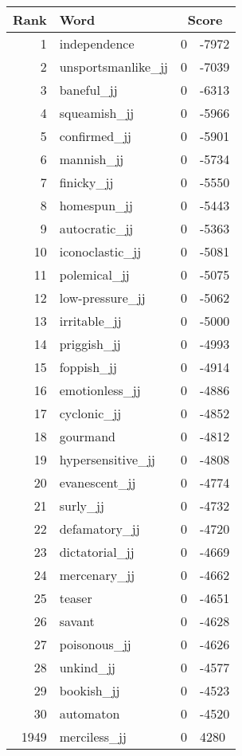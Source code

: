 \begin{longtable}[!htbp]{| rlr@{.}l |}
    \hline
    \textbf{Rank} & \textbf{Word} & \multicolumn{2}{c|}{\textbf{Score}} \\
    \hline
    \endhead
    1 & independence & 0 & -7972 \\
    2 & unsportsmanlike\_jj & 0 & -7039 \\
    3 & baneful\_jj & 0 & -6313 \\
    4 & squeamish\_jj & 0 & -5966 \\
    5 & confirmed\_jj & 0 & -5901 \\
    6 & mannish\_jj & 0 & -5734 \\
    7 & finicky\_jj & 0 & -5550 \\
    8 & homespun\_jj & 0 & -5443 \\
    9 & autocratic\_jj & 0 & -5363 \\
    10 & iconoclastic\_jj & 0 & -5081 \\
    11 & polemical\_jj & 0 & -5075 \\
    12 & low-pressure\_jj & 0 & -5062 \\
    13 & irritable\_jj & 0 & -5000 \\
    14 & priggish\_jj & 0 & -4993 \\
    15 & foppish\_jj & 0 & -4914 \\
    16 & emotionless\_jj & 0 & -4886 \\
    17 & cyclonic\_jj & 0 & -4852 \\
    18 & gourmand & 0 & -4812 \\
    19 & hypersensitive\_jj & 0 & -4808 \\
    20 & evanescent\_jj & 0 & -4774 \\
    21 & surly\_jj & 0 & -4732 \\
    22 & defamatory\_jj & 0 & -4720 \\
    23 & dictatorial\_jj & 0 & -4669 \\
    24 & mercenary\_jj & 0 & -4662 \\
    25 & teaser & 0 & -4651 \\
    26 & savant & 0 & -4628 \\
    27 & poisonous\_jj & 0 & -4626 \\
    28 & unkind\_jj & 0 & -4577 \\
    29 & bookish\_jj & 0 & -4523 \\
    30 & automaton & 0 & -4520 \\
    1949 & merciless\_jj & 0 & 4280 \\

\end{longtable}

